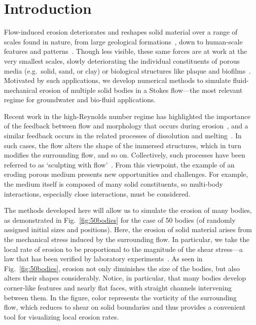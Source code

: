 \documentclass[preprint, 10pt]{elsarticle}
\begin{document}
\maketitle

\section{Introduction\label{s:intro}}
Flow-induced erosion deteriorates and reshapes solid material over a
range of scales found in nature, from large geological
formations~\cite{han1969, Rothman2012, coh-dev-sey-yi-szy-rot2015}, down
to human-scale features and patterns~\cite{daerr2003erosion}. Though
less visible, these same forces are at work at the very smallest scales,
slowly deteriorating the individual constituents of porous media
(e.g.~solid, sand, or clay) or biological structures like plaque and
biofilms~\cite{pic-van-hei2000, sha2002, gro-gij-van-fer-hat-van-yua-wen2007}. Motivated by such applications, we
develop numerical methods to simulate fluid-mechanical erosion of
multiple solid bodies in a Stokes flow---the most relevant regime for groundwater and bio-fluid applications.

Recent work in the high-Reynolds number regime has highlighted the
importance of the feedback between flow and morphology that occurs
during erosion~\cite{ris-moo-chi-she-zha2012, moo-ris-chi-zha-she2013,
hewett2017evolution, moore2017riemann}, and a similar feedback occurs in
the related processes of dissolution and melting~\cite{Huang2015,
kondratiuk2015steadily, rycroft2016asymmetric, cohen2016erosion,
hewett2017pear, claudin2017dissolution}. In such cases, the flow alters
the shape of the immersed structures, which in turn modifies the
surrounding flow, and so on. Collectively, such processes have been
referred to as `sculpting with flow'~\cite{ristroph2018sculpting}. From
this viewpoint, the example of an eroding porous medium presents new
opportunities and challenges. For example, the medium itself is composed
of many solid constituents, so multi-body interactions, especially close
interactions, must be considered.

The methods developed here will allow us to simulate the erosion of many
bodies, as demonstrated in Fig.~\ref{fig:50bodies} for the case of 50
bodies (of randomly assigned initial sizes and positions). Here, the
erosion of solid material arises from the mechanical stress induced by
the surrounding flow. In particular, we take the local rate of erosion
to be proportional to the magnitude of the shear stress---a law that has
been verified by laboratory experiments~\cite{ris-moo-chi-she-zha2012}.
As seen in Fig.~\ref{fig:50bodies}, erosion not only diminishes the size
of the bodies, but also alters their shapes considerably. Notice, in
particular, that many bodies develop corner-like features and nearly
flat faces, with straight channels intervening between them. In the
figure, color represents the vorticity of the surrounding flow, which
reduces to shear on solid boundaries and thus provides a convenient tool
for visualizing local erosion rates.  
\end{document}
